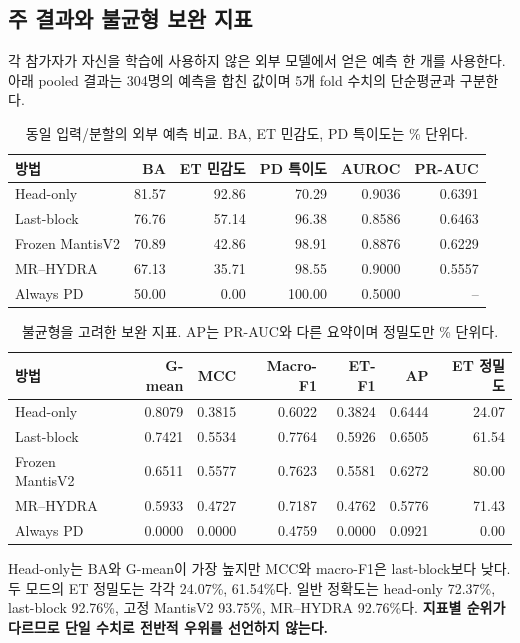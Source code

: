 \documentclass[11pt,a4paper]{article}
\begin{document}
\subsection{주 결과와 불균형 보완 지표}
각 참가자가 자신을 학습에 사용하지 않은 외부 모델에서 얻은 예측 한 개를 사용한다.
아래 pooled 결과는 304명의 예측을 합친 값이며 5개 fold 수치의 단순평균과 구분한다.
\begin{table}[H]\centering\small
\caption{동일 입력/분할의 외부 예측 비교. BA, ET 민감도, PD 특이도는 \% 단위다.}
\label{tab:main}\setlength{\tabcolsep}{4pt}
\begin{tabular}{@{}lrrrrr@{}}\toprule
방법 & BA & ET 민감도 & PD 특이도 & AUROC & PR-AUC\\\midrule
Head-only & 81.57 & 92.86 & 70.29 & 0.9036 & 0.6391 \\
Last-block & 76.76 & 57.14 & 96.38 & 0.8586 & 0.6463 \\
Frozen MantisV2 & 70.89 & 42.86 & 98.91 & 0.8876 & 0.6229 \\
MR--HYDRA & 67.13 & 35.71 & 98.55 & 0.9000 & 0.5557 \\
Always PD & 50.00 & 0.00 & 100.00 & 0.5000 & -- \\
\bottomrule\end{tabular}
\end{table}
\begin{table}[H]\centering\small
\caption{불균형을 고려한 보완 지표. AP는 PR-AUC와 다른 요약이며 정밀도만 \% 단위다.}
\label{tab:imbalance}\setlength{\tabcolsep}{4pt}
\begin{tabular}{@{}lrrrrrr@{}}\toprule
방법 & G-mean & MCC & Macro-F1 & ET-F1 & AP & ET 정밀도\\\midrule
Head-only & 0.8079 & 0.3815 & 0.6022 & 0.3824 & 0.6444 & 24.07 \\
Last-block & 0.7421 & 0.5534 & 0.7764 & 0.5926 & 0.6505 & 61.54 \\
Frozen MantisV2 & 0.6511 & 0.5577 & 0.7623 & 0.5581 & 0.6272 & 80.00 \\
MR--HYDRA & 0.5933 & 0.4727 & 0.7187 & 0.4762 & 0.5776 & 71.43 \\
Always PD & 0.0000 & 0.0000 & 0.4759 & 0.0000 & 0.0921 & 0.00 \\
\bottomrule\end{tabular}
\end{table}

Head-only는 BA와 G-mean이 가장 높지만 MCC와 macro-F1은 last-block보다 낮다.
두 모드의 ET 정밀도는 각각 24.07\%, 61.54\%다.
일반 정확도는 head-only 72.37\%, last-block 92.76\%,
고정 MantisV2 93.75\%, MR--HYDRA 92.76\%다.
\textbf{지표별 순위가 다르므로 단일 수치로 전반적 우위를 선언하지 않는다.}
\end{document}
